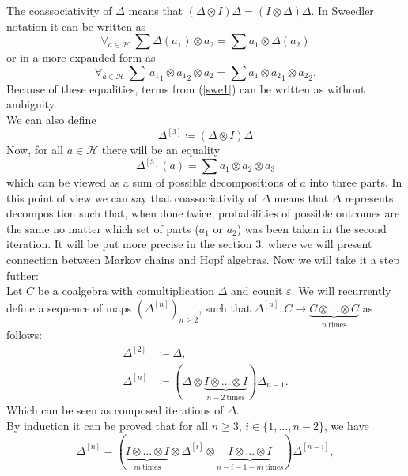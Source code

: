 \documentclass[a4paper, 12pt]{article}
\begin{document}
The coassociativity of $\Delta$ means that $(\Delta \otimes I)\Delta = (I \otimes \Delta)\Delta$.
In Sweedler notation it can be written as
\begin{equation*}
\forall_{a \in \mathcal{H}}\ \sum\Delta(a_1) \otimes a_2 = \sum a_1 \otimes \Delta(a_2)
\end{equation*}
or in a more expanded form as
\begin{equation}\label{swe1}
\forall_{a\in \mathcal{H}}\ \sum\ {a_1}_1 \otimes {a_1}_2 \otimes a_2 = \sum a_1 \otimes {a_2}_1
\otimes {a_2}_2.
\end{equation}
Because of these equalities, terms from (\ref{swe1}) can be written as
 without ambiguity. \\
We can also define
\begin{equation*}
\Delta^{[3]} \coloneqq (\Delta \otimes I)\Delta
\end{equation*}
Now, for all $a \in \mathcal{H}$ there will be an equality
\begin{equation*}
\Delta^{[3]}(a) = \sum a_1 \otimes a_2 \otimes a_3
\end{equation*}
which can be viewed as a sum of possible decompositions of $a$ into three parts.
In this point of view we can say that coassociativity of $\Delta$ means that $\Delta$ represents
decomposition such that, when done twice, probabilities of possible outcomes are the same
no matter which set of parts ($a_1$ or $a_2$) was been taken in the second iteration. It will be put more
precise in the section 3. where we will present connection between Markov chains and Hopf algebras.
Now we will take it a step futher: \\[8pt]
\indent Let $C$ be a coalgebra with comultiplication $\Delta$ and counit $\varepsilon$.
We will recurrently define a sequence of maps $(\Delta^{[n]})_{n \geq 2}$, such that
$\Delta^{[n]} : C \to \underbrace{C \otimes \dots \otimes C}_{n \mathrm{\ times}}$ as follows:
\begin{align*}
\Delta^{[2]} &\coloneqq \Delta, \\
\Delta^{[n]} &\coloneqq (\Delta \otimes
\underbrace{I \otimes \dots \otimes I}_{n - 2 \mathrm{\ times}})\Delta_{n-1}.
\end{align*}
Which can be seen as composed iterations of $\Delta$. \\
By induction it can be proved that for all $n \geq 3$, $i \in \{1, \dots, n-2\}$,
 we have
\begin{equation*}
\Delta^{[n]} = (\underbrace{I \otimes \dots \otimes I}_{m\ \mathrm{times}} \otimes
\Delta^{[i]} \otimes \underbrace{I \otimes \dots \otimes I}_{n-i-1-m \mathrm{\ times}})\Delta^{[n-i]},
\end{equation*}
\end{document}
